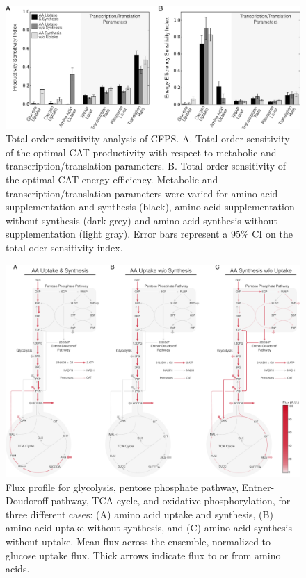 \documentclass[journal=asbcd6,manuscript=article]{achemso}
\begin{document}
\clearpage

\begin{figure}[t!]
\includegraphics[width=1.00\textwidth]{./figs/Fig-3-Sensitivity-Analysis.pdf}
\caption{Total order sensitivity analysis of CFPS.
A. Total order sensitivity of the optimal CAT productivity with respect to metabolic and transcription/translation parameters.
B. Total order sensitivity of the optimal CAT energy efficiency.
Metabolic and transcription/translation parameters were varied for amino acid supplementation and synthesis (black), amino acid supplementation without synthesis (dark grey) and amino acid synthesis without supplementation (light gray).
Error bars represent a 95\% CI on the total-oder sensitivity index.}
\label{fig:SI}
\end{figure}

\clearpage

\begin{figure}[t!]
\includegraphics[width=1.00\textwidth]{./figs/Fig-5-FluxDistribition-Optimal.pdf}
\caption{Flux profile for glycolysis, pentose phosphate pathway, Entner-Doudoroff pathway, TCA cycle, and oxidative phosphorylation, for three different cases: (A) amino acid uptake and synthesis, (B) amino acid uptake without synthesis, and (C) amino acid synthesis without uptake. Mean flux across the ensemble, normalized to glucose uptake flux. Thick arrows indicate flux to or from amino acids.}
\label{fig:flux}
\end{figure}
\end{document}
